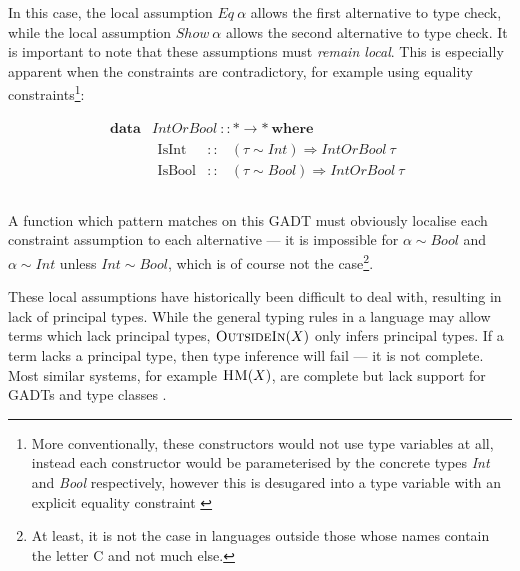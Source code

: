 \documentclass[a4paper]{jfp}
\newcommand{\outsidein}{\textsc{OutsideIn}(X)}
\begin{document}
\medskip

In this case, the local assumption $\mathit{Eq}\ \alpha$ allows the first alternative to type check, while the local assumption $\mathit{Show}\
\alpha$ allows the second alternative to type check. It is important to note that these assumptions must \emph{remain local}. This is especially
apparent when the constraints are contradictory, for example using equality constraints\footnote{More conventionally, these constructors would not use
   type variables at all, instead each constructor would be parameterised by the concrete types \emph{Int} and \emph{Bool} respectively, however this
   is desugared into a type variable with an explicit equality constraint \cite{Schrijvers:2009jg}}:

\begin{displaymath}
	\begin{array}{ll}		
		\textbf{data} & \mathit{IntOrBool}\ :: \mathtt{*} \rightarrow \mathtt{*}\ \textbf{where} \\
		              & \begin{array}{lcl}
                         \text{IsInt} & :: & (\tau \sim \mathit{Int}) \Rightarrow \mathit{IntOrBool}\ \tau \\
                         \text{IsBool} & :: & (\tau \sim \mathit{Bool}) \Rightarrow \mathit{IntOrBool}\ \tau \\
					    \end{array} \\						
     \end{array}
\end{displaymath}


\medskip

A function which pattern matches on this GADT must obviously localise each constraint assumption to each alternative --- it is impossible for $\alpha
\sim \mathit{Bool}$ and $\alpha \sim \mathit{Int}$ unless $\mathit{Int} \sim \mathit{Bool}$, which is of course not the case\footnote{At least, it is
   not the case in languages outside those whose names contain the letter C and not much else.}. 


\medskip

These local assumptions have historically been difficult to deal with, resulting in lack of principal types. While the general typing rules in a
language may allow terms which lack principal types, $\outsidein$ only infers principal types. If a term lacks a principal type, then type inference
will fail --- it is not complete. Most similar systems, for example $\textsc{HM}(X)$, are complete but lack support for GADTs and type classes
\cite{Pottier:2005ue}.
\end{document}
